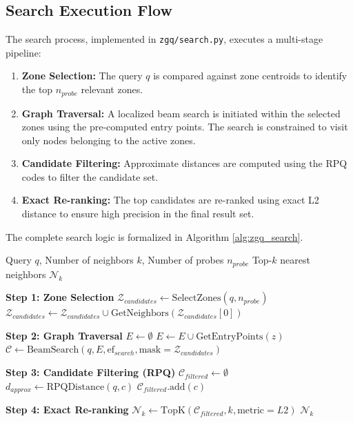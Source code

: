 \documentclass[conference]{IEEEtran}
\begin{document}
\subsection{Search Execution Flow}
The search process, implemented in \texttt{zgq/search.py}, executes a multi-stage pipeline:
\begin{enumerate}
    \item \textbf{Zone Selection:} The query $q$ is compared against zone centroids to identify the top $n_{probe}$ relevant zones.
    \item \textbf{Graph Traversal:} A localized beam search is initiated within the selected zones using the pre-computed entry points. The search is constrained to visit only nodes belonging to the active zones.
    \item \textbf{Candidate Filtering:} Approximate distances are computed using the RPQ codes to filter the candidate set.
    \item \textbf{Exact Re-ranking:} The top candidates are re-ranked using exact L2 distance to ensure high precision in the final result set.
\end{enumerate}

The complete search logic is formalized in Algorithm \ref{alg:zgq_search}.

\begin{algorithm}[H]
\caption{ZGQ Search Algorithm\label{alg:zgq_search}}
\begin{algorithmic}[1]
\REQUIRE Query $q$, Number of neighbors $k$, Number of probes $n_{probe}$
\ENSURE Top-$k$ nearest neighbors $\mathcal{N}_k$

\STATE \textbf{Step 1: Zone Selection}
\STATE $\mathcal{Z}_{candidates} \leftarrow \text{SelectZones}(q, n_{probe})$
    \STATE $\mathcal{Z}_{candidates} \leftarrow \mathcal{Z}_{candidates} \cup \text{GetNeighbors}(\mathcal{Z}_{candidates}[0])$
\ENDIF

\STATE \textbf{Step 2: Graph Traversal}
\STATE $E \leftarrow \emptyset$ 
    \STATE $E \leftarrow E \cup \text{GetEntryPoints}(z)$
\ENDFOR
\STATE $\mathcal{C} \leftarrow \text{BeamSearch}(q, E, \text{ef}_{search}, \text{mask}=\mathcal{Z}_{candidates})$

\STATE \textbf{Step 3: Candidate Filtering (RPQ)}
\STATE $\mathcal{C}_{filtered} \leftarrow \emptyset$
    \STATE $d_{approx} \leftarrow \text{RPQDistance}(q, c)$
        \STATE $\mathcal{C}_{filtered}.\text{add}(c)$
    \ENDIF
\ENDFOR

\STATE \textbf{Step 4: Exact Re-ranking}
\STATE $\mathcal{N}_k \leftarrow \text{TopK}(\mathcal{C}_{filtered}, k, \text{metric}=L2)$
\RETURN $\mathcal{N}_k$
\end{algorithmic}
\end{algorithm}
\end{document}
